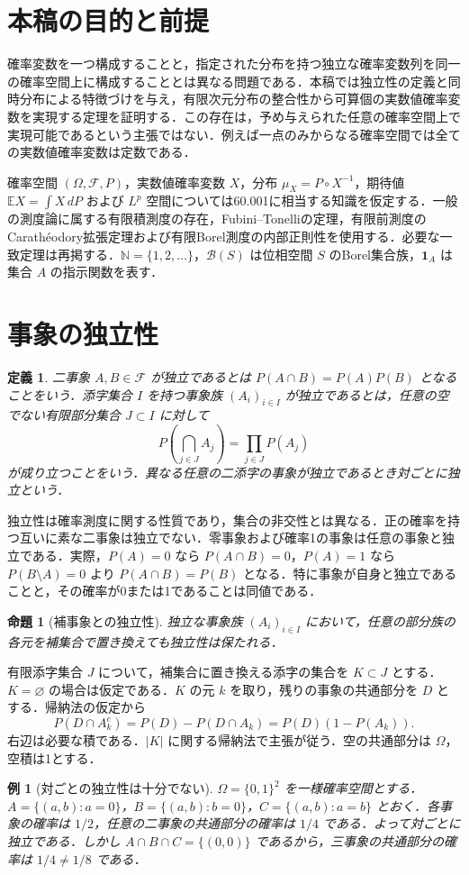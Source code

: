 \documentclass[a5paper,10pt,onecolumn]{jsarticle}
\makeatletter
\theoremstyle{mathnotetheorem}
\newtheorem{definition}[theorem]{定義}
\newtheorem{proposition}[theorem]{命題}
\newtheorem{example}[theorem]{例}
\renewcommand{\proofname}{証明}
\renewenvironment{proof}[1][\proofname]{%
  \par\pushQED{\qed}\normalfont\topsep4\p@\@plus2\p@\relax
  \trivlist\item[\hskip\labelsep\bfseries #1]\ignorespaces
}{\popQED\endtrivlist\@endpefalse}
\newcommand{\N}{\mathbb{N}}
\newcommand{\F}{\mathcal F}
\newcommand{\B}{\mathcal B}
\newcommand{\E}{\mathbb E}
\newcommand{\1}{\mathbf{1}}
\makeatother
\begin{document}
\section{本稿の目的と前提}
確率変数を一つ構成することと，指定された分布を持つ独立な確率変数列を同一の確率空間上に構成することとは異なる問題である．本稿では独立性の定義と同時分布による特徴づけを与え，有限次元分布の整合性から可算個の実数値確率変数を実現する定理を証明する．この存在は，予め与えられた任意の確率空間上で実現可能であるという主張ではない．例えば一点のみからなる確率空間では全ての実数値確率変数は定数である．

確率空間 $(\Omega,\F,P)$，実数値確率変数 $X$，分布 $\mu_X=P\circ X^{-1}$，期待値 $\E X=\int X\,dP$ および $L^p$ 空間については60.001に相当する知識を仮定する．一般の測度論に属する有限積測度の存在，Fubini--Tonelliの定理，有限前測度のCarath\'eodory拡張定理および有限Borel測度の内部正則性を使用する．必要な一致定理は再掲する．$\N=\{1,2,\ldots\}$，$\B(S)$ は位相空間 $S$ のBorel集合族，$\1_A$ は集合 $A$ の指示関数を表す．

\section{事象の独立性}
\begin{definition}
二事象 $A,B\in\F$ が独立であるとは $P(A\cap B)=P(A)P(B)$ となることをいう．添字集合 $I$ を持つ事象族 $(A_i)_{i\in I}$ が独立であるとは，任意の空でない有限部分集合 $J\subset I$ に対して
\[
 P\left(\bigcap_{j\in J}A_j\right)=\prod_{j\in J}P(A_j)
\]
が成り立つことをいう．異なる任意の二添字の事象が独立であるとき対ごとに独立という．
\end{definition}
独立性は確率測度に関する性質であり，集合の非交性とは異なる．正の確率を持つ互いに素な二事象は独立でない．零事象および確率1の事象は任意の事象と独立である．実際，$P(A)=0$ なら $P(A\cap B)=0$，$P(A)=1$ なら $P(B\setminus A)=0$ より $P(A\cap B)=P(B)$ となる．特に事象が自身と独立であることと，その確率が0または1であることは同値である．
\begin{proposition}[補事象との独立性]\label{comp}
独立な事象族 $(A_i)_{i\in I}$ において，任意の部分族の各元を補集合で置き換えても独立性は保たれる．
\end{proposition}
\begin{proof}
有限添字集合 $J$ について，補集合に置き換える添字の集合を $K\subset J$ とする．$K=\varnothing$ の場合は仮定である．$K$ の元 $k$ を取り，残りの事象の共通部分を $D$ とする．帰納法の仮定から
\[
 P(D\cap A_k^c)=P(D)-P(D\cap A_k)
 =P(D)(1-P(A_k)).
\]
右辺は必要な積である．$|K|$ に関する帰納法で主張が従う．空の共通部分は $\Omega$，空積は1とする．
\end{proof}
\begin{example}[対ごとの独立性は十分でない]\label{pair}
$\Omega=\{0,1\}^2$ を一様確率空間とする．$A=\{(a,b):a=0\}$，$B=\{(a,b):b=0\}$，$C=\{(a,b):a=b\}$ とおく．各事象の確率は $1/2$，任意の二事象の共通部分の確率は $1/4$ である．よって対ごとに独立である．しかし $A\cap B\cap C=\{(0,0)\}$ であるから，三事象の共通部分の確率は $1/4\ne1/8$ である．
\end{example}
\end{document}
